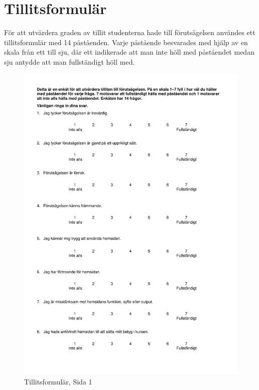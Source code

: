 \section{Tillitsformulär}
\label{app:AI-test}

För att utvärdera graden av tillit studenterna hade till förutsägelsen användes ett tillitsformulär med 14 påståenden. Varje påstående besvarades med hjälp av en skala från ett till sju, där ett indikerade att man inte höll med påståendet medan sju antydde att man fullständigt höll med.






\begin{figure}[htp]
    \centering
    \includegraphics[page=1,scale=0.8]{appendix/tillit_form.pdf}
    \caption*{Tillitsformulär, Sida 1}
    \label{fig:tillit_form1}
\end{figure}

